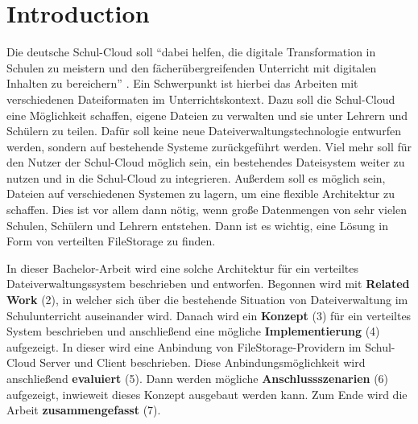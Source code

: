 \section{Introduction}
\label{sec:intro}

Die deutsche Schul-Cloud soll ``dabei helfen, die digitale Transformation in Schulen zu meistern und den fächerübergreifenden Unterricht mit digitalen Inhalten zu bereichern'' \cite{paper:technischerbericht}. Ein Schwerpunkt ist hierbei das Arbeiten mit verschiedenen Dateiformaten im Unterrichtskontext. Dazu soll die Schul-Cloud eine Möglichkeit schaffen, eigene Dateien zu verwalten und sie unter Lehrern und Schülern zu teilen. Dafür soll keine neue Dateiverwaltungstechnologie entwurfen werden, sondern auf bestehende Systeme zurückgeführt werden. Viel mehr soll für den Nutzer der Schul-Cloud möglich sein, ein bestehendes Dateisystem weiter zu nutzen und in die Schul-Cloud zu integrieren. Außerdem soll es möglich sein, Dateien auf verschiedenen Systemen zu lagern, um eine flexible Architektur zu schaffen. Dies ist vor allem dann nötig, wenn große Datenmengen von sehr vielen Schulen, Schülern und Lehrern entstehen. Dann ist es wichtig, eine Lösung in Form von verteilten FileStorage zu finden.

In dieser Bachelor-Arbeit wird eine solche Architektur für ein verteiltes Dateiverwaltungssystem beschrieben und entworfen. Begonnen wird mit \textbf{Related Work} (2), in welcher sich über die bestehende Situation von Dateiverwaltung im Schulunterricht auseinander wird. Danach wird ein \textbf{Konzept} (3) für ein verteiltes System beschrieben und anschließend eine mögliche \textbf{Implementierung} (4)  aufgezeigt. In dieser wird eine Anbindung von FileStorage-Providern im Schul-Cloud Server und Client beschrieben. Diese Anbindungsmöglichkeit wird anschließend \textbf{evaluiert} (5). Dann werden mögliche \textbf{Anschlussszenarien} (6) aufgezeigt, inwieweit dieses Konzept ausgebaut werden kann. Zum Ende wird die Arbeit \textbf{zusammengefasst} (7).

\clearpage
